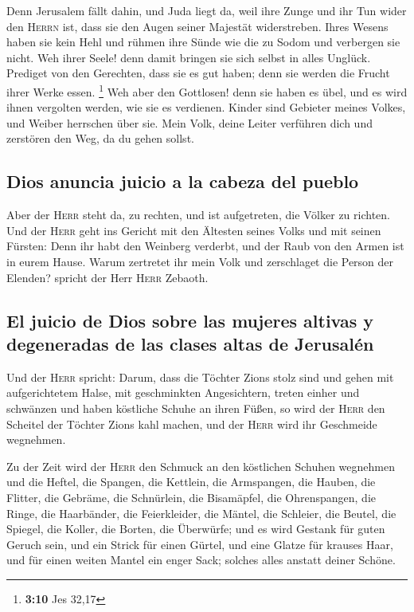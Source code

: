  Denn Jerusalem fällt dahin, und Juda liegt da, weil ihre
Zunge und ihr Tun wider den \textsc{Herrn} ist, dass sie den Augen
seiner Majestät widerstreben.  Ihres Wesens haben sie kein
Hehl und rühmen ihre Sünde wie die zu Sodom und verbergen sie nicht. Weh
ihrer Seele! denn damit bringen sie sich selbst in alles Unglück.
 Prediget von den Gerechten, dass sie es gut haben; denn
sie werden die Frucht ihrer Werke essen. \footnote{\textbf{3:10} Jes
  32,17}  Weh aber den Gottlosen! denn sie haben es übel,
und es wird ihnen vergolten werden, wie sie es verdienen.
 Kinder sind Gebieter meines Volkes, und Weiber herrschen
über sie. Mein Volk, deine Leiter verführen dich und zerstören den Weg,
da du gehen sollst.

\hypertarget{dios-anuncia-juicio-a-la-cabeza-del-pueblo}{%
\subsection{Dios anuncia juicio a la cabeza del
pueblo}\label{dios-anuncia-juicio-a-la-cabeza-del-pueblo}}

 Aber der \textsc{Herr} steht da, zu rechten, und ist
aufgetreten, die Völker zu richten.  Und der
\textsc{Herr} geht ins Gericht mit den Ältesten seines Volks und mit
seinen Fürsten: Denn ihr habt den Weinberg verderbt, und der Raub von
den Armen ist in eurem Hause.  Warum zertretet ihr mein
Volk und zerschlaget die Person der Elenden? spricht der Herr
\textsc{Herr} Zebaoth.

\hypertarget{el-juicio-de-dios-sobre-las-mujeres-altivas-y-degeneradas-de-las-clases-altas-de-jerusaluxe9n}{%
\subsection{El juicio de Dios sobre las mujeres altivas y degeneradas de
las clases altas de
Jerusalén}\label{el-juicio-de-dios-sobre-las-mujeres-altivas-y-degeneradas-de-las-clases-altas-de-jerusaluxe9n}}

 Und der \textsc{Herr} spricht: Darum, dass die Töchter
Zions stolz sind und gehen mit aufgerichtetem Halse, mit geschminkten
Angesichtern, treten einher und schwänzen und haben köstliche Schuhe an
ihren Füßen,  so wird der \textsc{Herr} den Scheitel der
Töchter Zions kahl machen, und der \textsc{Herr} wird ihr Geschmeide
wegnehmen.

 Zu der Zeit wird der \textsc{Herr} den Schmuck an den
köstlichen Schuhen wegnehmen und die Heftel, die Spangen,
 die Kettlein, die Armspangen, die Hauben,
 die Flitter, die Gebräme, die Schnürlein, die
Bisamäpfel, die Ohrenspangen,  die Ringe, die Haarbänder,
 die Feierkleider, die Mäntel, die Schleier, die Beutel,
 die Spiegel, die Koller, die Borten, die Überwürfe;
 und es wird Gestank für guten Geruch sein, und ein
Strick für einen Gürtel, und eine Glatze für krauses Haar, und für einen
weiten Mantel ein enger Sack; solches alles anstatt deiner Schöne.

